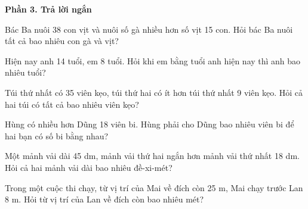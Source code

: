 \textbf{Phần 3. Trả lời ngắn}

\begin{ex} %
Bác Ba nuôi 38 con vịt và nuôi số gà nhiều hơn số vịt 15 con. Hỏi bác Ba nuôi tất cả bao nhiêu con gà và vịt?
\end{ex}

\begin{ex} %
Hiện nay anh 14 tuổi, em 8 tuổi. Hỏi khi em bằng tuổi anh hiện nay thì anh bao nhiêu tuổi?
\end{ex}

\begin{ex} %
Túi thứ nhất có 35 viên kẹo, túi thứ hai có ít hơn túi thứ nhất 9 viên kẹo. Hỏi cả hai túi có tất cả bao nhiêu viên kẹo?
\end{ex}

\begin{ex} %
Hùng có nhiều hơn Dũng 18 viên bi. Hùng phải cho Dũng bao nhiêu viên bi để hai bạn có số bi bằng nhau?
\end{ex}

\begin{ex} %
Một mảnh vải dài 45 dm, mảnh vải thứ hai ngắn hơn mảnh vải thứ nhất 18 dm. Hỏi cả hai mảnh vải dài bao nhiêu đề-xi-mét?
\end{ex}

\begin{ex} %
Trong một cuộc thi chạy, từ vị trí của Mai về đích còn 25 m, Mai chạy trước Lan 8 m. Hỏi từ vị trí của Lan về đích còn bao nhiêu mét?
\end{ex}
